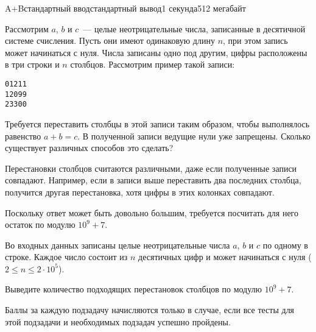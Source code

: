 \begin{problem}{A+B}{стандартный ввод}{стандартный вывод}{1 секунда}{512 мегабайт}

Рассмотрим $a$, $b$ и $c$~--- целые неотрицательные числа, записанные в десятичной системе счисления. Пусть они имеют одинаковую длину $n$, при этом запись может начинаться с нуля. Числа записаны одно под другим, цифры расположены в три строки и $n$ столбцов. Рассмотрим пример такой записи:

\begin{center}
\texttt{01211}\\
\texttt{12099}\\
\texttt{23300}
\end{center}

Требуется переставить столбцы в этой записи таким образом, чтобы выполнялось равенство $a+b=c$. В полученной записи ведущие нули уже запрещены. Сколько существует различных способов это сделать?

Перестановки столбцов считаются различными, даже если полученные записи совпадают. Например, если в записи выше переставить два последних столбца, получится другая перестановка, хотя цифры в этих колонках совпадают.

Поскольку ответ может быть довольно большим, требуется посчитать для него остаток по модулю $10^9+7$.

\InputFile
Во входных данных записаны целые неотрицательные числа $a$, $b$ и $c$ по одному в строке. Каждое число состоит из $n$ десятичных цифр и может начинаться с нуля ($2 \leq n \leq 2 \cdot 10^5$).

\OutputFile
Выведите количество подходящих перестановок столбцов по модулю $10^9+7$.


\Scoring
Баллы за каждую подзадачу начисляются только в случае, если все тесты для этой
подзадачи и необходимых подзадач успешно пройдены.


\end{problem}
